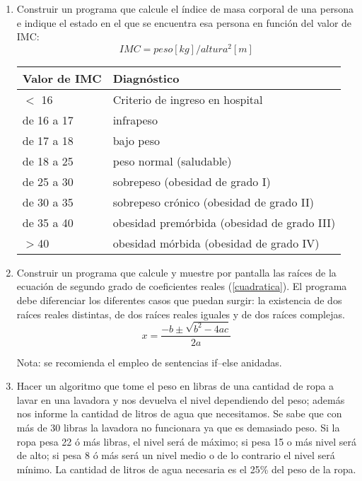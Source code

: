 \begin{enumerate}[resume]
  \item Construir un programa que calcule el índice de masa
    corporal de una persona e indique el estado
    en el que se encuentra esa persona en función del valor de IMC:
    \[IMC = peso [kg] / altura^2 [m] \] 
    \begin{table}[H]
     \begin{center}
      \begin{tabular}{l|l}
        Valor de IMC &    Diagnóstico\\
        \toprule
        $<$ 16         &      Criterio de ingreso en hospital\\
        de 16 a 17   &   infrapeso\\
        de 17 a 18   &   bajo peso\\
        de 18 a 25   & peso normal (saludable)\\
        de 25 a 30   &   sobrepeso (obesidad de grado I)\\
        de 30 a 35   &   sobrepeso crónico (obesidad de grado II)\\
        de 35 a 40   &   obesidad premórbida (obesidad de grado III)\\
        $>$40          &       obesidad mórbida (obesidad de grado IV)\\
      \end{tabular}
     \end{center}
    \end{table}       

  \item Construir un programa que calcule y muestre por pantalla
    las raíces de la ecuación de segundo grado de coeficientes reales (\ref{cuadratica}). El
    programa debe diferenciar los diferentes casos que puedan surgir: la
    existencia de dos raíces reales distintas, de dos raíces reales iguales y
    de dos raíces complejas.  
    \begin{equation}
    \label{cuadratica}
    x =\frac{ -b \pm \sqrt{b^2-4ac}}{2a}
    \end{equation}
    
    Nota: se recomienda el empleo de sentencias if–else anidadas.
     
  \item Hacer un algoritmo que tome el peso en libras de una
    cantidad de ropa a lavar en una lavadora y nos devuelva el nivel
    dependiendo del peso; además nos informe la cantidad de litros de agua que
    necesitamos. Se sabe que con más de 30 libras la lavadora no funcionara ya
    que es demasiado peso. Si la ropa pesa 22 ó más libras, el nivel será de
    máximo; si pesa 15 o más nivel será de alto; si pesa 8 ó más será un nivel
    medio o de lo contrario el nivel será mínimo. La cantidad de litros de agua
    necesaria es el 25\% del peso de la ropa.
     

\end{enumerate}
